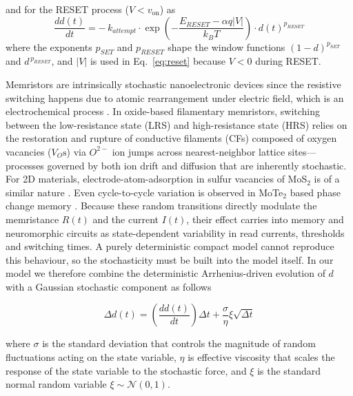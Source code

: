 \documentclass[aip,apl,reprint,floatfix]{revtex4-2}
\begin{document}
and for the RESET process ($V < v_{\text{on}}$) as
\begin{equation}
    \frac{dd(t)}{dt} = -\,k_{attempt} \cdot \exp\left( -\frac{E_{RESET} - \alpha q|V|}{k_B T} \right) \cdot d(t)^{p_{RESET}}
    \label{eq:reset}
\end{equation}
\noindent where the exponents $p_{SET}$ and $p_{RESET}$ shape the window functions $(1-d)^{p_{SET}}$ and $d^{\,p_{RESET}}$, and $|V|$ is used in Eq.~\eqref{eq:reset} because $V<0$ during RESET.

Memristors are intrinsically stochastic nanoelectronic devices since the resistive switching happens due to atomic rearrangement under electric field, which is an electrochemical process \cite{Filatov,Lee}. In oxide-based filamentary memristors, switching between the low-resistance state (LRS) and high-resistance state (HRS) relies on the restoration and rupture of conductive filaments (CFs) composed of oxygen vacancies ($V_O\text{s}$) via $O^{2-}$ ion jumps across nearest-neighbor lattice sites—processes governed by both ion drift and diffusion that are inherently stochastic. For 2D materials, electrode-atom-adsorption in sulfur vacancies of MoS$_2$ is of a similar nature \cite{Tsai2017}. Even cycle-to-cycle variation is observed in MoTe$_2$ based phase change memory \cite{Hong}.  Because these random transitions directly modulate the memristance $R(t)$ and the current $I(t)$, their effect carries into memory and neuromorphic circuits as state-dependent variability in read currents, thresholds and switching times. A purely deterministic compact model cannot reproduce this behaviour, so the stochasticity must be built into the model itself. In our model we therefore combine the deterministic Arrhenius-driven evolution of $d$ with a Gaussian stochastic component as follows

\begin{equation}
\Delta d(t) = \left( \frac{dd(t)}{dt} \right) \Delta t + \frac{\sigma}{\eta} \xi \sqrt{\Delta t}
\end{equation}

\noindent where $\sigma$ is the standard deviation that controls the magnitude of random fluctuations acting on the state variable, $\eta$ is effective viscosity that scales the response of the state variable to the stochastic force, and $\xi$ is the standard normal random variable $\xi \sim \mathcal{N}(0,1)$.
\end{document}

